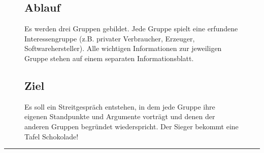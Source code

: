 \documentclass[11pt,a4paper,DIV=8,]{scrartcl}
\begin{document}
%
\begin{figure}[H]
\begin{minipage}[]{0.15\linewidth}
\subsection*{Ablauf}
\end{minipage}
\hfill
\begin{minipage}[t]{0.85\linewidth}
Es werden drei Gruppen gebildet. Jede Gruppe spielt eine erfundene Interessengruppe (z.B. privater Verbraucher, Erzeuger, Softwarehersteller). Alle wichtigen Informationen zur jeweiligen Gruppe stehen auf einem separaten Informationsblatt.
\end{minipage}
\end{figure}
%
\begin{figure}[H]
\begin{minipage}[]{0.15\linewidth}
\subsection*{Ziel}
\end{minipage}
\hfill
\begin{minipage}[t]{0.85\linewidth}
Es soll ein Streitgespräch entstehen, in dem jede Gruppe ihre eigenen
Standpunkte und Argumente vorträgt und denen der anderen Gruppen
begründet wiederspricht. Der Sieger bekommt eine Tafel Schokolade!
\end{minipage}
\end{figure}
\hrule
\end{document}
